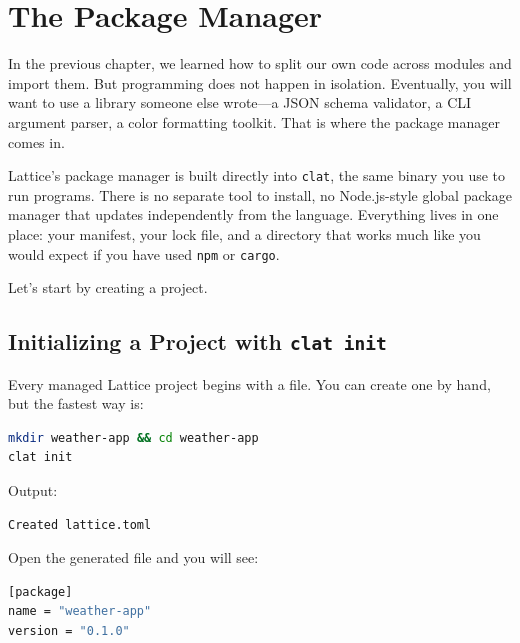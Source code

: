 \chapter{The Package Manager}\label{ch:package-manager}


In the previous chapter, we learned how to split our own code across modules and import them.
But programming does not happen in isolation.
Eventually, you will want to use a library someone else wrote---a JSON schema validator, a CLI argument parser, a color formatting toolkit.
That is where the package manager comes in.

Lattice's package manager is built directly into \texttt{clat}, the same binary you use to run programs.
There is no separate tool to install, no Node.js-style global package manager that updates independently from the language.
Everything lives in one place: your manifest, your lock file, and a  directory that works much like you would expect if you have used \texttt{npm} or \texttt{cargo}.

Let's start by creating a project.

\section{Initializing a Project with \texttt{clat init}}\label{sec:clat-init}

Every managed Lattice project begins with a  file.
You can create one by hand, but the fastest way is:

\begin{lstlisting}[language=bash, numbers=none]
mkdir weather-app && cd weather-app
clat init
\end{lstlisting}

Output:

\begin{lstlisting}[language=bash, numbers=none]
Created lattice.toml
\end{lstlisting}

Open the generated file and you will see:

\begin{lstlisting}[language=bash, numbers=none, caption={A freshly generated lattice.toml}]
[package]
name = "weather-app"
version = "0.1.0"
\end{lstlisting}

